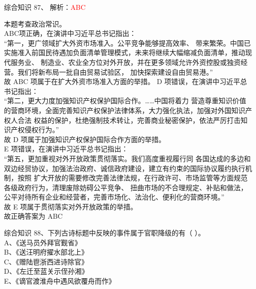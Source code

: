 \documentclass[aspectratio=169]{beamer}
\begin{document}
\begin{frame}[t]{综合知识}
    87、 解析：\textcolor{red}{ABC}\\
    {\scriptsize

    本题考查政治常识。\\
    ABC项正确，在演讲中习近平总书记指出：\\
    “第一，更广领域扩大外资市场准入。公平竞争能够提高效率、
    带来繁荣。中国已实施准入前国民待遇加负面清单管理模式，未来将继续大幅缩减负面清单，推动现代服务业、
    制造业、农业全方位对外开放，并在更多领域允许外资控股或独资经营。我们将新布局一批自由贸易试验区，
    加快探索建设自由贸易港。”\\
    故 ABC 项属于在扩大外资市场准入方面的举措。
    D 项错误，在演讲中习近平总书记指出：\\
    “第二，更大力度加强知识产权保护国际合作。……中国将着力
    营造尊重知识价值的营商环境，全面完善知识产权保护法律体系，大力强化执法，加强对外国知识产权人合法
    权益的保护，杜绝强制技术转让，完善商业秘密保护，依法严厉打击知识产权侵权行为。”\\
    故 D 项属于加强知识产权保护国际合作方面的举措。\\

    E 项错误，在演讲中习近平总书记指出：\\
    “第五，更加重视对外开放政策贯彻落实。我们高度重视履行同
    各国达成的多边和双边经贸协议，加强法治政府、诚信政府建设，建立有约束的国际协议履约执行机制，按照
    扩大开放的需要修改完善法律法规，在行政许可、市场监管等方面规范各级政府行为，清理废除妨碍公平竞争、
    扭曲市场的不合理规定、补贴和做法，公平对待所有企业和经营者，完善市场化、法治化、便利化的营商环境。”\\

    故 E 项属于贯彻落实对外开放政策的举措。\\
    故正确答案为 ABC

    }

\end{frame}                           




\begin{frame}[t]{综合知识}
    88、下列古诗标题中反映的事件属于官职降级的有（ ）。\\
    A、《送马员外拜官觐省》                            \\
    B、《送汪明府擢水部北上》                          \\
    C、《赠陆鬯浙西进诗除官》                          \\
    D、《左迁至蓝关示侄孙湘》                          \\
    E、《谪官渡淮舟中遇风欲覆舟而作》                  \\
\end{frame}                           
\end{document}

